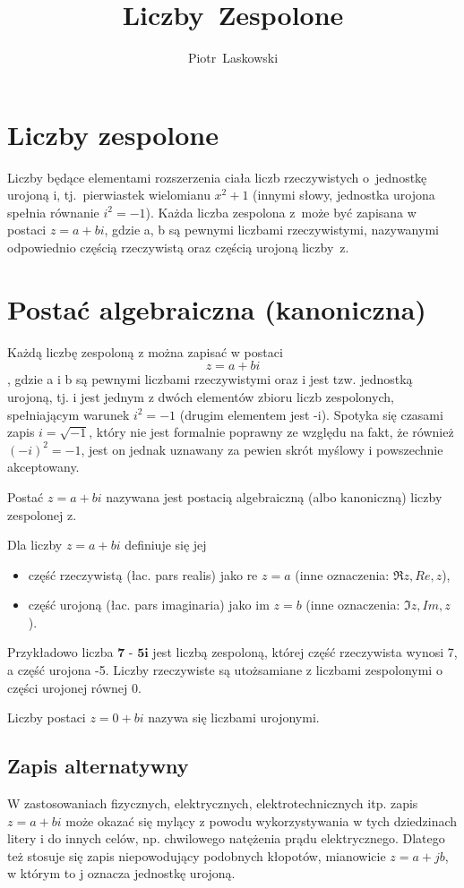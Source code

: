 \documentclass[a4paper,11pt]{article}
\author{Piotr~Laskowski}
\title{Liczby~Zespolone}
\begin{document}
\maketitle
\tableofcontents
\section{Liczby zespolone}
 Liczby będące elementami rozszerzenia ciała liczb rzeczywistych o~jednostkę urojoną i, tj.~pierwiastek wielomianu $x^2+1$ (innymi słowy, jednostka urojona spełnia równanie $i^2 = -1$). Każda liczba zespolona z~może być zapisana w postaci $z=a + bi$, gdzie a, b są pewnymi liczbami rzeczywistymi, nazywanymi odpowiednio częścią rzeczywistą oraz częścią urojoną liczby~z.
\section{Postać algebraiczna (kanoniczna)}
Każdą liczbę zespoloną z można zapisać w postaci $$z=a+bi$$, gdzie a i b są pewnymi liczbami rzeczywistymi oraz i jest tzw. jednostką urojoną, tj. i jest jednym z dwóch elementów zbioru liczb zespolonych, spełniającym warunek $i^2=-1$ (drugim elementem jest -i). Spotyka się czasami zapis $i=\sqrt{-1}$, który nie jest formalnie poprawny ze względu na fakt, że również $(-i)^2=-1$, jest on jednak uznawany za pewien skrót myślowy i powszechnie akceptowany.

Postać $z=a+bi$ nazywana jest postacią algebraiczną (albo kanoniczną) liczby zespolonej z.

Dla liczby $z=a+bi$ definiuje się jej
\begin{itemize}
\item część rzeczywistą (łac. pars realis) jako re $z = a$ (inne oznaczenia: $\Re z, Re, z$),
\item część urojoną (łac. pars imaginaria) jako im $z = b$ (inne oznaczenia: $\Im z, Im, z$).
\end{itemize}
Przykładowo liczba $\textbf{7 - 5i}$ jest liczbą zespoloną, której część rzeczywista wynosi 7, a część urojona -5. Liczby rzeczywiste są utożsamiane z liczbami zespolonymi o części urojonej równej 0.

Liczby postaci $z = 0 + bi$ nazywa się liczbami urojonymi.
\subsection{Zapis alternatywny}
W zastosowaniach fizycznych, elektrycznych, elektrotechnicznych itp. zapis $z = a + bi$ może okazać się mylący z powodu wykorzystywania w tych dziedzinach litery \textrm{\Large{i}} do innych celów, np. chwilowego natężenia prądu elektrycznego. Dlatego też stosuje się zapis niepowodujący podobnych kłopotów, mianowicie $z = a + jb$, w którym to j oznacza jednostkę urojoną.
\end{document}
